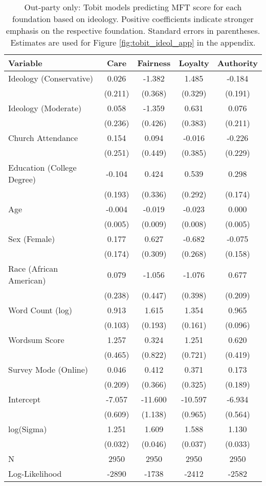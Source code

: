 \begin{table}[ht]
\centering
\caption{Out-party only: Tobit models predicting MFT score for each foundation based 
           on ideology. Positive coefficients indicate stronger emphasis on the respective 
           foundation. Standard errors in parentheses. Estimates are used for  
           Figure \ref{fig:tobit_ideol_app} in the appendix.} 
\label{tab:tobit_out}
\begingroup\footnotesize
\begin{tabular}{lcccc}
  \hline
Variable & Care & Fairness & Loyalty & Authority \\ 
  \hline
Ideology (Conservative) &  0.026 &  -1.382 &   1.485 & -0.184 \\ 
   & (0.211) & (0.368) & (0.329) & (0.191) \\ 
  Ideology (Moderate) &  0.058 &  -1.359 &   0.631 &  0.076 \\ 
   & (0.236) & (0.426) & (0.383) & (0.211) \\ 
  Church Attendance &  0.154 &   0.094 &  -0.016 & -0.226 \\ 
   & (0.251) & (0.449) & (0.385) & (0.229) \\ 
  Education (College Degree) & -0.104 &   0.424 &   0.539 &  0.298 \\ 
   & (0.193) & (0.336) & (0.292) & (0.174) \\ 
  Age & -0.004 &  -0.019 &  -0.023 &  0.000 \\ 
   & (0.005) & (0.009) & (0.008) & (0.005) \\ 
  Sex (Female) &  0.177 &   0.627 &  -0.682 & -0.075 \\ 
   & (0.174) & (0.309) & (0.268) & (0.158) \\ 
  Race (African American) &  0.079 &  -1.056 &  -1.076 &  0.677 \\ 
   & (0.238) & (0.447) & (0.398) & (0.209) \\ 
  Word Count (log) &  0.913 &   1.615 &   1.354 &  0.965 \\ 
   & (0.103) & (0.193) & (0.161) & (0.096) \\ 
  Wordsum Score &  1.257 &   0.324 &   1.251 &  0.620 \\ 
   & (0.465) & (0.822) & (0.721) & (0.419) \\ 
  Survey Mode (Online) &  0.046 &   0.412 &   0.371 &  0.173 \\ 
   & (0.209) & (0.366) & (0.325) & (0.189) \\ 
  Intercept & -7.057 & -11.600 & -10.597 & -6.934 \\ 
   & (0.609) & (1.138) & (0.965) & (0.564) \\ 
  log(Sigma) &  1.251 &   1.609 &   1.588 &  1.130 \\ 
   & (0.032) & (0.046) & (0.037) & (0.033) \\ 
   \hline
N & 2950 & 2950 & 2950 & 2950 \\ 
  Log-Likelihood & -2890 & -1738 & -2412 & -2582 \\ 
   \hline
\end{tabular}
\endgroup
\end{table}

